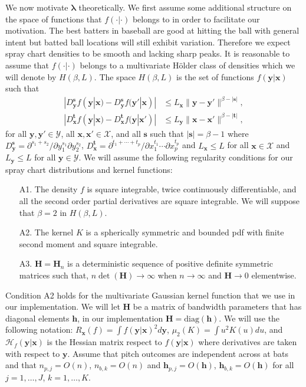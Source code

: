 \documentclass[12pt]{article}
\newcommand{\Y}{\mathcal{Y}}
\newcommand{\X}{\mathcal{X}}
\newcommand{\Hcal}{\mathcal{H}}
\newcommand{\Hbf}{\textbf{H}}
\newcommand{\y}{\textbf{y}}
\newcommand{\x}{\textbf{x}}
\newcommand{\h}{\textbf{h}}
\newcommand{\s}{\textbf{s}}
\newcommand{\tbf}{\textbf{t}}
\newcommand{\lambdabf}{\boldsymbol{\lambda}}
\begin{document}
We now motivate $\lambdabf$ theoretically. We first assume some additional structure on the space of functions that $f(\cdot|\cdot)$ belongs to in order to facilitate our motivation. The best batters in baseball are good at hitting the ball with general intent but batted ball locations will still exhibit variation. Therefore we expect spray chart densities to be smooth and lacking sharp peaks. It is reasonable to assume that $f(\cdot|\cdot)$ belongs to a multivariate H{\"o}lder class of densities which we will denote by $H(\beta,L)$. The space $H(\beta,L)$ is the set of functions $f(\y|\x)$ such that 
\begin{align*}
|D_{\y}^\s f(\y|\x) - D_{\y}^\s f(\y'|\x)| &\leq L_\x\|\y - \y'\|^{\beta - |\s|}, \\
|D_{\x}^\tbf f(\y|\x) - D_{\x}^\tbf f(\y|\x')| &\leq L_\y\|\x - \x'\|^{\beta - |\tbf|}, 
\end{align*}
for all $\y,\y' \in \Y$, all $\x,\x' \in \X$, and all $\s$ such that $|\s| = \beta - 1$ where
$D_{\y}^\s = \partial^{s_1 + s_2}/\partial y_1^{s_1} \partial y_2^{s_2}$, 
$D_{\x}^\tbf = \partial^{t_1 + \cdots + t_p}/\partial x_1^{t_1} \cdots \partial x_p^{t_p}$ and $L_\x \leq L$ for all $\x \in \X$ and $L_\y \leq L$ for all $\y \in \Y$. 
We will assume the following regularity conditions for our spray chart distributions and kernel functions: 

\begin{itemize}
\item[A1.] The density $f$ is square integrable, twice continuously differentiable, and all the second order partial derivatives are square integrable. We will suppose that $\beta = 2$ in $H(\beta,L)$.
\item[A2.] The kernel $K$ is a spherically symmetric and bounded pdf with finite second moment and square integrable.
\item[A3.] $\Hbf = \Hbf_n$ is a deterministic sequence of positive definite symmetric matrices such that, $n\det(\Hbf) \to \infty$ when $n \to \infty$ and $\Hbf \to 0$ elementwise. 
\end{itemize}

Condition A2 holds for the multivariate Gaussian kernel function that we use in our implementation.
We will let $\Hbf$ be a matrix of bandwidth parameters that has diagonal elements $\h$, in our implementation $\Hbf = \text{diag}(\h)$. We will use the following notation: $R_{\x}(f) = \int f(\y|\x)^2 d\y$, $\mu_2(K) = \int u^2K(u)du$, and $\Hcal_f(\y|\x)$ is the Hessian matrix respect to $f(\y|\x)$ where derivatives are taken with respect to $\y$. Assume that pitch outcomes are independent across at bats and that $n_{p,j} = O(n)$, $n_{b,k} = O(n)$ and $\h_{p,j} = O(\h)$, $\h_{b,k} = O(\h)$ for all $j = 1, \ldots, J$, $k = 1, \ldots, K$. 
\end{document}
